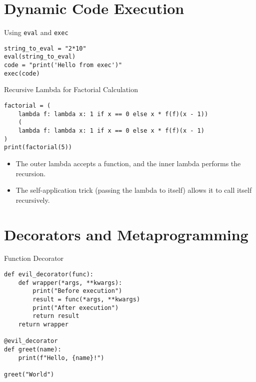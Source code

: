 \documentclass{beamer}
\begin{document}
\section{Dynamic Code Execution}
\begin{frame}[fragile]{Using \texttt{eval} and \texttt{exec}  }
\begin{lstlisting}
string_to_eval = "2*10"
eval(string_to_eval)
code = "print('Hello from exec')"
exec(code)
\end{lstlisting}

\end{frame}

\begin{frame}[fragile]{Recursive Lambda for Factorial Calculation}
\begin{lstlisting}[breaklines=true]
factorial = (
    lambda f: lambda x: 1 if x == 0 else x * f(f)(x - 1))
    (
    lambda f: lambda x: 1 if x == 0 else x * f(f)(x - 1)
)
print(factorial(5))
\end{lstlisting}
\vspace{1em}
\begin{itemize}
  \item The outer lambda accepts a function, and the inner lambda performs the recursion.
  \item The self-application trick (passing the lambda to itself) allows it to call itself recursively.
\end{itemize}
\end{frame}


\section{Decorators and Metaprogramming}
\begin{frame}[fragile]{Function Decorator}
\begin{lstlisting}
def evil_decorator(func):
    def wrapper(*args, **kwargs):
        print("Before execution")
        result = func(*args, **kwargs)
        print("After execution")
        return result
    return wrapper

@evil_decorator
def greet(name):
    print(f"Hello, {name}!")
    
greet("World")
\end{lstlisting}
\end{frame}
\end{document}
